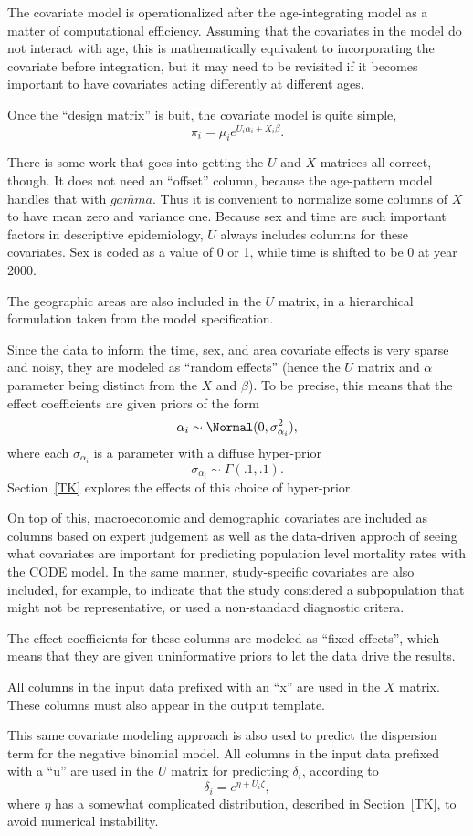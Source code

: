 The covariate model is operationalized after the age-integrating model
as a matter of computational efficiency.  Assuming that the covariates
in the model do not interact with age, this is mathematically
equivalent to incorporating the covariate before integration, but it
may need to be revisited if it becomes important to have covariates
acting differently at different ages.

Once the ``design matrix'' is buit, the covariate model is quite simple,
\[
\pi_i = \mu_i e^{U_i\alpha_i + X_i\beta}.
\]

There is some work that goes into getting the $U$ and $X$ matrices all
correct, though.  It does not need an ``offset'' column, because the
age-pattern model handles that with $\bar{gamma}$.  Thus it is
convenient to normalize some columns of $X$ to have mean zero
and variance one.  Because sex and time are such important factors in
descriptive epidemiology, $U$ always includes columns for these
covariates.  Sex is coded as a value of 0 or 1, while time is shifted
to be 0 at year 2000.

The geographic areas are also included in the $U$ matrix, in a
hierarchical formulation taken from the model specification.

Since the data to inform the time, sex, and area covariate effects is
very sparse and noisy, they are modeled as ``random effects'' (hence
the $U$ matrix and $\alpha$ parameter being distinct from the $X$ and
$\beta$).  To be precise, this means that the effect coefficients are given priors of
the form
\[
\alpha_i \sim \Normal(0, \sigma_{\alpha_i}^2),
\]
where each $\sigma_{\alpha_i}$ is a parameter with a diffuse hyper-prior
\[
\sigma_{\alpha_i} \sim \Gamma(.1, .1).
\]
Section~\ref{TK} explores the effects of this choice of hyper-prior.


On top of this, macroeconomic and demographic covariates are included
as columns based on expert judgement as well as the data-driven
approch of seeing what covariates are important for predicting
population level mortality rates with the CODE model. In the same
manner, study-specific covariates are also included, for example, to
indicate that the study considered a subpopulation that might not be
representative, or used a non-standard diagnostic critera.

The effect coefficients for these columns are modeled as ``fixed
effects'', which means that they are given uninformative priors to let
the data drive the results.

All columns in the input data prefixed with an ``x'' are used in the
$X$ matrix.  These columns must also appear in the output template.

This same covariate modeling approach is also used to predict the
dispersion term for the negative binomial model.  All columns in the
input data prefixed with a ``u'' are used in the $U$ matrix for
predicting $\delta_i$, according to
\[
\delta_i = e^{\eta + U_i\zeta},
\]
where $\eta$ has a somewhat complicated distribution, described in
Section~\ref{TK}, to avoid numerical instability.
